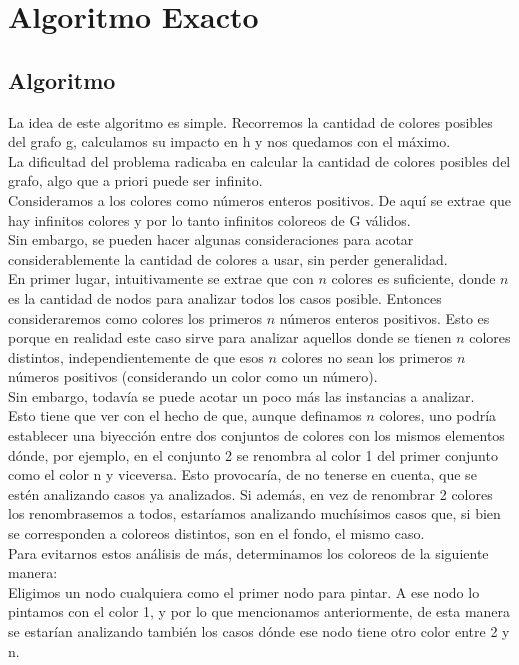 \section{Algoritmo Exacto}

\subsection{Algoritmo}

\indent La idea de este algoritmo es simple. Recorremos la cantidad de colores posibles del grafo g, calculamos su impacto en h y nos quedamos con el máximo.\\
\indent La dificultad del problema radicaba en calcular la cantidad de colores posibles del grafo, algo que a priori puede ser infinito.\\
\indent Consideramos a los colores como números enteros positivos. De aquí se extrae que hay infinitos colores y por lo tanto infinitos coloreos de G válidos.\\
\indent Sin embargo, se pueden hacer algunas consideraciones para acotar considerablemente la cantidad de colores a usar, sin perder generalidad.\\
\indent En primer lugar, intuitivamente se extrae que con $n$ colores es suficiente, donde $n$ es la cantidad de nodos para analizar todos los casos posible. Entonces consideraremos como colores los primeros $n$ números enteros positivos. Esto es porque en realidad este caso sirve para analizar aquellos donde se tienen $n$ colores distintos, independientemente de que esos $n$ colores no sean los primeros $n$ números positivos (considerando un color como un número).\\
\indent Sin embargo, todavía se puede acotar un poco más las instancias a analizar.\\
\indent Esto tiene que ver con el hecho de que, aunque definamos $n$ colores, uno podría establecer una biyección entre dos conjuntos de colores con los mismos elementos dónde, por ejemplo, en el conjunto 2 se renombra al color 1 del primer conjunto como el color n y viceversa. Esto provocaría, de no tenerse en cuenta, que se estén analizando casos ya analizados. Si además, en vez de renombrar 2 colores los renombrasemos a todos, estaríamos analizando muchísimos casos que, si bien se corresponden a coloreos distintos, son en el fondo, el mismo caso.\\
\indent Para evitarnos estos análisis de más, determinamos los coloreos de la siguiente manera:\\
\indent Eligimos un nodo cualquiera como el primer nodo para pintar. A ese nodo lo pintamos con el color 1, y por lo que mencionamos anteriormente, de esta manera se estarían analizando también los casos dónde ese nodo tiene otro color entre 2 y n.\\
